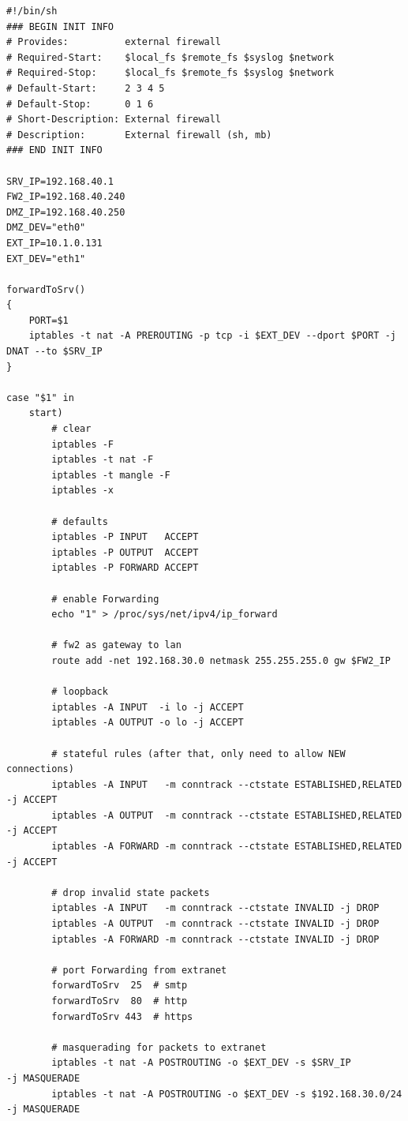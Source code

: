 \begin{lstlisting}[label=lst:masq,caption={Masquerading.}]
#!/bin/sh
### BEGIN INIT INFO
# Provides:          external firewall
# Required-Start:    $local_fs $remote_fs $syslog $network
# Required-Stop:     $local_fs $remote_fs $syslog $network
# Default-Start:     2 3 4 5
# Default-Stop:      0 1 6
# Short-Description: External firewall
# Description:       External firewall (sh, mb)
### END INIT INFO

SRV_IP=192.168.40.1
FW2_IP=192.168.40.240
DMZ_IP=192.168.40.250
DMZ_DEV="eth0"
EXT_IP=10.1.0.131
EXT_DEV="eth1"

forwardToSrv()
{
    PORT=$1
    iptables -t nat -A PREROUTING -p tcp -i $EXT_DEV --dport $PORT -j DNAT --to $SRV_IP
}

case "$1" in
    start)
        # clear
        iptables -F
        iptables -t nat -F
        iptables -t mangle -F
        iptables -x

        # defaults
        iptables -P INPUT   ACCEPT
        iptables -P OUTPUT  ACCEPT
        iptables -P FORWARD ACCEPT

        # enable Forwarding
        echo "1" > /proc/sys/net/ipv4/ip_forward

        # fw2 as gateway to lan
        route add -net 192.168.30.0 netmask 255.255.255.0 gw $FW2_IP

        # loopback
        iptables -A INPUT  -i lo -j ACCEPT
        iptables -A OUTPUT -o lo -j ACCEPT

        # stateful rules (after that, only need to allow NEW connections)
        iptables -A INPUT   -m conntrack --ctstate ESTABLISHED,RELATED -j ACCEPT
        iptables -A OUTPUT  -m conntrack --ctstate ESTABLISHED,RELATED -j ACCEPT
        iptables -A FORWARD -m conntrack --ctstate ESTABLISHED,RELATED -j ACCEPT

        # drop invalid state packets
        iptables -A INPUT   -m conntrack --ctstate INVALID -j DROP
        iptables -A OUTPUT  -m conntrack --ctstate INVALID -j DROP
        iptables -A FORWARD -m conntrack --ctstate INVALID -j DROP

        # port Forwarding from extranet
        forwardToSrv  25  # smtp
        forwardToSrv  80  # http
        forwardToSrv 443  # https

        # masquerading for packets to extranet
        iptables -t nat -A POSTROUTING -o $EXT_DEV -s $SRV_IP          -j MASQUERADE
        iptables -t nat -A POSTROUTING -o $EXT_DEV -s $192.168.30.0/24 -j MASQUERADE


\end{lstlisting}
